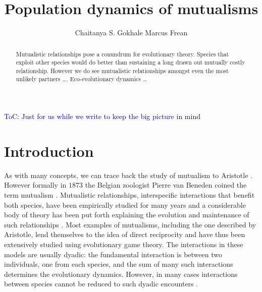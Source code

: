 \documentclass{pnastwo}
\newcommand{\cha}[1]{\textcolor{darkblue}{#1}}
\begin{document}
\title{Population dynamics of mutualisms}

 \author{
Chaitanya S. Gokhale 
Marcus Frean\affil{2}{\cha{Victoria University...address details}}
}


\maketitle

\begin{article}

\begin{abstract}
Mutualistic relationships pose a conundrum for evolutionary theory.
Species that exploit other species would do better than sustaining a long drawn out mutually costly relationship. However we do see mutualistic relationships amongst even the most unlikely partners \ldots.
Eco-evolutionary dynamics \ldots
\end{abstract}



\tableofcontents

\cha{ToC: Just for us while we write to keep the big picture in mind}

\section{Introduction}

As with many concepts, we can trace back the study of mutualism to Aristotle \cite{aristotle:350bc}.
However formally in $1873$ the Belgian zoologist Pierre van Beneden coined the term mutualism \cite{bronstein:book:2003}.
Mutualistic relationships, interspecific interactions that benefit both species, have been empirically studied for many years 
\cite{boucher:book:1985,hinton:PTENHS:1951,wilson:AmNat:1983,bronstein:QRB:1994,pierce:ARE:2002,kiers:Nature:2003,bshary:ASB:2004} and a considerable body of theory has been put forth explaining the evolution and maintenance of such relationships \cite{poulin:JTB:1995,doebeli:PNAS:1998,noe:book:2001,johnstone:ECL:2002,bergstrom:PNAS:2003,hoeksema:AmNat:2003,akcay:PRSB:2007,bshary:Nature:2008}.
Most examples of mutualisms, including the one described by Aristotle, lend themselves to the idea of direct reciprocity \cite{trivers:QRB:1971} and have thus been extensively studied using evolutionary game theory.
The interactions in these models are usually dyadic: the fundamental interaction is between two individuals, one from each species, and the sum of many such interactions determines the evolutionary dynamics. %
However, in many cases interactions between species cannot be reduced to such dyadic encounters \cite{stadler:book:2008}.


\end{article}
\end{document}
